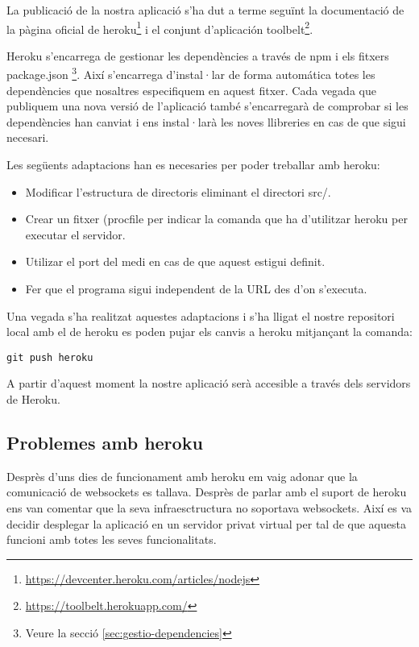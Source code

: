 La publicació de la nostra aplicació s'ha dut a terme seguïnt la documentació de la pàgina oficial de heroku\footnote{\url{https://devcenter.heroku.com/articles/nodejs}} i el conjunt d'aplicación toolbelt\footnote{\url{https://toolbelt.herokuapp.com/}}. 

Heroku s'encarrega de gestionar les dependències a través de npm i els fitxers package.json \footnote{Veure la secció \ref{sec:gestio-dependencies}}. Així s'encarrega d'instal·lar de forma automática totes les dependències que nosaltres especifiquem en aquest fitxer. Cada vegada que publiquem una nova versió de l'aplicació també s'encarregarà de comprobar si les dependències han canviat i ens instal·larà les noves llibreries en cas de que sigui necesari. 

Les següents adaptacions han es necesaries per poder treballar amb heroku: 

\begin{itemize}
\item{Modificar l'estructura de directoris eliminant el directori src/.}
\item{Crear un fitxer (procfile per indicar la comanda que ha d'utilitzar heroku per executar el servidor.}
\item{Utilizar el port del medi en cas de que aquest estigui definit. }
\item{Fer que el programa sigui independent de la URL des d'on s'executa.}
\end{itemize}

Una vegada s'ha realitzat aquestes adaptacions i s'ha lligat el nostre repositori local amb el de heroku es poden pujar els canvis a heroku mitjançant la comanda: 

\begin{verbatim}
git push heroku
\end{verbatim}

A partir d'aquest moment la nostre aplicació serà accesible a través dels servidors de Heroku.

\subsection{Problemes amb heroku}

Desprès d'uns dies de funcionament amb heroku em vaig adonar que la comunicació de websockets es tallava. Desprès de parlar amb el suport de heroku ens van comentar que la seva infraesctructura no soportava websockets. Així es va decidir desplegar la aplicació en un servidor privat virtual per tal de que aquesta funcioni amb totes les seves funcionalitats. 

